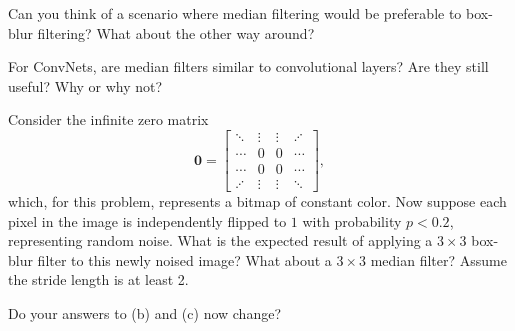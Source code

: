 \documentclass[11pt]{article}
\begin{document}
\begin{subparts}
    Can you think of a scenario where median filtering would be preferable to box-blur filtering? What about the other way around?


    \subpart For ConvNets, are median filters similar to convolutional layers? Are they still useful? Why or why not?


    \newpage
    
    \subpart Consider the infinite zero matrix 
    $$\mathbf{0} = \begin{bmatrix}
        \ddots & \vdots & \vdots & \iddots \\
        \cdots & 0 & 0 & \cdots \\
        \cdots & 0 & 0 & \cdots \\
        \iddots & \vdots & \vdots & \ddots
    \end{bmatrix},$$ which, for this problem, represents a bitmap of constant color. Now suppose each pixel in the image is independently flipped to $1$ with probability $p < 0.2$, representing random noise. What is the expected result of applying a $3 \times 3$ box-blur filter to this newly noised image? What about a $3 \times 3$ median filter? Assume the stride length is at least 2.
    
    Do your answers to (b) and (c) now change?




\end{subparts}
\end{document}

